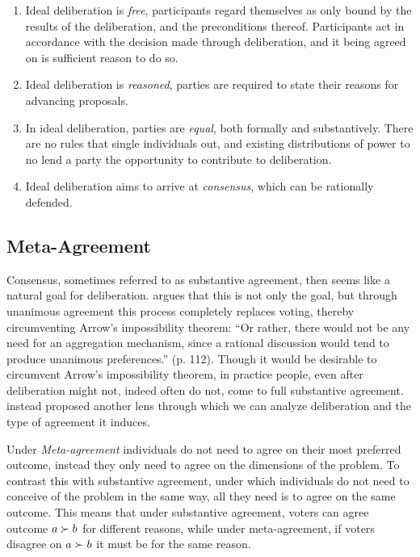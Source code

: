 \begin{enumerate}
	\label{list:ideal-deliberation}
	\setlength\itemsep{1px}
	\item  Ideal deliberation is \emph{free}, participants regard themselves as only bound by the results of the deliberation, and the preconditions thereof. Participants act in accordance with the decision made through deliberation, and it being agreed on is sufficient reason to do so.
	\item  Ideal deliberation is \emph{reasoned}, parties are required to state their reasons for advancing proposals.
	\item  In ideal deliberation, parties are \emph{equal}, both formally and substantively. There are no rules that single individuals out, and existing distributions of power to no lend a party the opportunity to contribute to deliberation.
	\item  Ideal deliberation aims to arrive at \emph{consensus}, which can be rationally defended.
\end{enumerate}

\subsection{Meta-Agreement}
\label{subsection:Meta-agreement}

Consensus, sometimes referred to as substantive agreement, then seems like a natural goal for deliberation. \citet{elsterMARKETFORUMThree2002} argues that this is not only the goal, but through unanimous agreement this process completely replaces voting, thereby circumventing Arrow's impossibility theorem: ``Or rather, there would not be any need for an aggregation mechanism, since a rational discussion would tend to produce unanimous preferences.'' (p. 112). Though it would be desirable to circumvent Arrow's impossibility theorem, in practice people, even after deliberation might not, indeed often do not, come to full substantive agreement. \citet{listTwoConceptsAgreement2002} instead proposed another lens through which we can analyze deliberation and the type of agreement it induces.

Under \emph{Meta-agreement} individuals do not need to agree on their most preferred outcome, instead they only need to agree on the dimensions of the problem. To contrast this with substantive agreement, under which individuals do not need to conceive of the problem in the same way, all they need is to agree on the same outcome. This means that under substantive agreement, voters can agree outcome $a \succ b$ for different reasons, while under meta-agreement, if voters disagree on $a \succ b$ it must be for the same reason.

